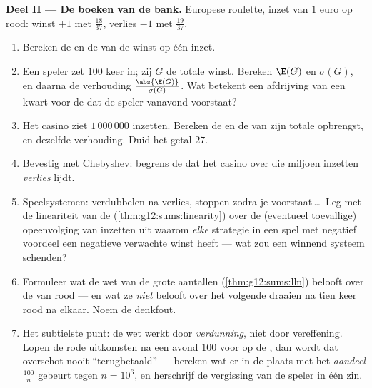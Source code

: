 \begin{problem}
\medskip
\noindent\textbf{Deel II --- De boeken van de bank.}
Europese roulette, inzet van $1$ euro op rood: winst $+1$ met 
$\frac{18}{37}$, verlies $-1$ met  $\frac{19}{37}$.
\begin{enumerate}[resume]
  \item Bereken de  en de  van de winst op
        één inzet.
  \item Een speler zet $100$ keer  in; zij $G$ de totale winst.
        Bereken $\E(G)$ en $\sigma(G)$, en daarna de verhouding
        $\frac{\abs{\E(G)}}{\sigma(G)}$. Wat betekent een afdrijving van een
        kwart  voor de  dat de speler vanavond
        voorstaat?
  \item Het casino ziet $1\,000\,000$ inzetten. Bereken de 
        en de  van zijn totale opbrengst, en dezelfde
        verhouding. Duid het getal $27$.
  \item Bevestig met Chebyshev: begrens de  dat het casino over die
        miljoen inzetten \emph{verlies} lijdt.
  \item Speelsystemen: verdubbelen na verlies, stoppen zodra je voorstaat\,\dots\
        Leg met de lineariteit van de 
        (\cref{thm:g12:sums:linearity}) over de (eventueel toevallige)
        opeenvolging van inzetten uit waarom \emph{elke} strategie in een spel
        met negatief voordeel een negatieve verwachte winst heeft --- wat zou
        een winnend systeem schenden?
  \item Formuleer wat de wet van de grote aantallen
        (\cref{thm:g12:sums:lln}) belooft over de  van rood --- en
        wat ze \emph{niet} belooft over het volgende draaien na tien keer rood
        na elkaar. Noem de denkfout.
  \item Het subtielste punt: de wet werkt door \emph{verdunning}, niet door
        vereffening. Lopen de rode uitkomsten na een avond $100$ voor op de
        \omterm{def:g12:randvar:exp}{verwachtingswaarde}, dan wordt dat overschot nooit ``terugbetaald'' ---
        bereken wat er in de plaats met het \emph{aandeel} $\frac{100}{n}$
        gebeurt tegen $n = 10^6$, en herschrijf de vergissing van de speler in
        één zin.
\end{enumerate}


\end{problem}
